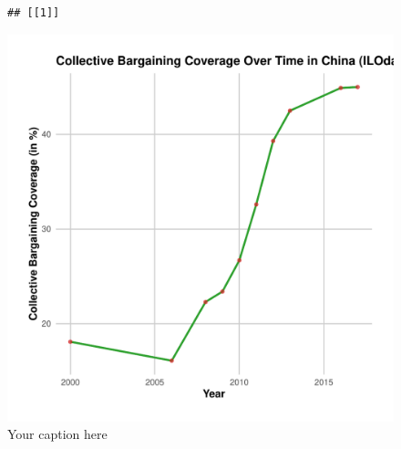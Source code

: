 \documentclass[11pt]{article}\usepackage[]{graphicx}\usepackage[]{xcolor}
\makeatletter
\newenvironment{kframe}{%
 \def\at@end@of@kframe{}%
 \ifinner\ifhmode%
  \def\at@end@of@kframe{\end{minipage}}%
  \begin{minipage}{\columnwidth}%
 \fi\fi%
 \def\FrameCommand##1{\hskip\@totalleftmargin \hskip-\fboxsep
 \colorbox{shadecolor}{##1}\hskip-\fboxsep
     \hskip-\linewidth \hskip-\@totalleftmargin \hskip\columnwidth}%
 \MakeFramed {\advance\hsize-\width
   \@totalleftmargin\z@ \linewidth\hsize
   \@setminipage}}%
 {\par\unskip\endMakeFramed%
 \at@end@of@kframe}
\newenvironment{knitrout}{}{} %
\makeatother
\begin{document}
\begin{figure}[h]
\centering
  \begin{minipage}{0.9\linewidth} %
\begin{knitrout}
\color{fgcolor}\begin{kframe}
\begin{verbatim}
## [[1]]
\end{verbatim}
\end{kframe}

{\centering \includegraphics[width=0.9\linewidth]{figure/ChinaCollectiveBargaining-1} 

}



\end{knitrout}
    \caption{Your caption here}
    \label{fig:ChinaCollectiveBargaining}
  \end{minipage}
\end{figure}
\end{document}

